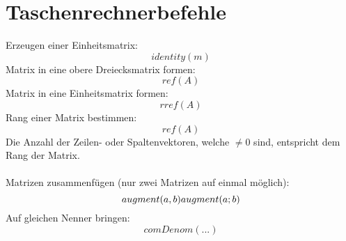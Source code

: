 



\chapter{Taschenrechnerbefehle}
Erzeugen einer Einheitsmatrix:
\[
	identity(m)
\]
Matrix in eine obere Dreiecksmatrix formen:
\[
	ref(A)
\]
Matrix in eine Einheitsmatrix formen:
\[
	rref(A)
\]
Rang einer Matrix bestimmen:
\[
	ref(A)
\]
Die Anzahl der Zeilen- oder Spaltenvektoren, welche $\neq0$ sind, entspricht dem Rang der Matrix. \\
\\
Matrizen zusammenfügen (nur zwei Matrizen auf einmal möglich):
\[
	augment(a,b) \\ augment(a;b)
\]
Auf gleichen Nenner bringen:
\[
	comDenom(...)
\]